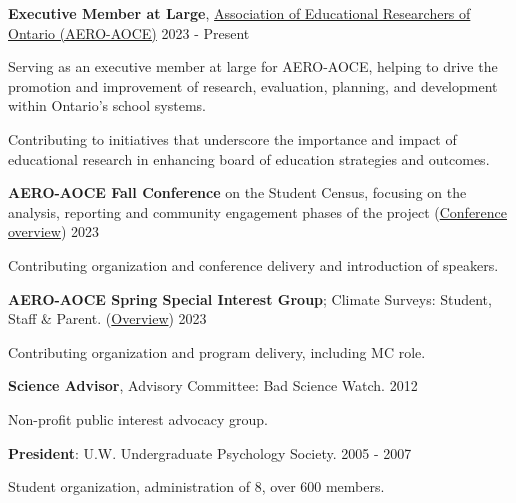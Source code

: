 \documentclass[10pt]{article}
\newenvironment{innerlist}[1][\enskip\textbullet]%
        {\begin{compactenum}[#1]}{\end{compactenum}}
\providecommand{\tightlist}{%
  \setlength{\itemsep}{0pt}\setlength{\parskip}{0pt}}
\begin{document}
\begin{outerlist}
\tightlist
\item
  \textbf{Executive Member at Large},
  \href{https://www.aero-aoce.org/aero-aoce-executiveexeacutecutif-drsquoaero-aoce.html}{Association
  of Educational Researchers of Ontario (AERO-AOCE)} \hfill 2023 -
  Present

 \begin{innerlist}
  \tightlist
  \item
    Serving as an executive member at large for AERO-AOCE, helping to
    drive the promotion and improvement of research, evaluation,
    planning, and development within Ontario's school systems.
  \item
    Contributing to initiatives that underscore the importance and
    impact of educational research in enhancing board of education
    strategies and outcomes.
 \end{innerlist}
\item
  \textbf{AERO-AOCE Fall Conference} on the Student Census, focusing on
  the analysis, reporting and community engagement phases of the project
  (\href{https://mail.google.com/mail/u/0/\#search/aero+fall+conference?projector=1}{Conference
  overview}) \hfill 2023

 \begin{innerlist}
  \tightlist
  \item
    Contributing organization and conference delivery and introduction
    of speakers.
 \end{innerlist}
\item
  \textbf{AERO-AOCE Spring Special Interest Group}; Climate Surveys:
  Student, Staff \& Parent.
  (\href{https://drive.google.com/file/d/1mNDOn_Xfc6B3_2UVLKF-4KWSdrHhBFQp/view}{Overview})
  \hfill 2023

 \begin{innerlist}
  \tightlist
  \item
    Contributing organization and program delivery, including MC role.
 \end{innerlist}
\item
  \textbf{Science Advisor}, Advisory Committee: Bad Science Watch.
  \hfill 2012

 \begin{innerlist}
  \tightlist
  \item
    Non-profit public interest advocacy group.
 \end{innerlist}
\item
  \textbf{President}: U.W. Undergraduate Psychology Society. \hfill 2005
  - 2007

 \begin{innerlist}
  \tightlist
  \item
    Student organization, administration of 8, over 600 members.
 \end{innerlist}
\end{outerlist}
\end{document}
